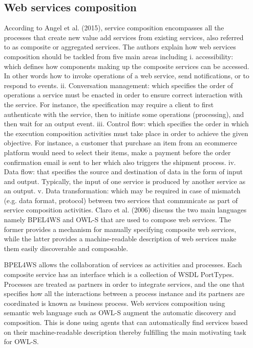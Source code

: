\documentclass{article}
\begin{document}
\begin{multicols}{2}
\subsection{Web services composition}
According to Angel et al. (2015), service composition encompasses all the processes that create new value add services from existing services, also referred to as composite or aggregated services. The authors explain how web services composition should be tackled from five main areas including i. accessibility: which defines how components making up the composite services can be accessed. In other words how to invoke operations of a web service, send notifications, or to respond to events. ii. Conversation management: which specifies the order of operations a service must be enacted in order to ensure correct interaction with the service. For instance, the specification may require a client to first authenticate with the service, then to initiate some operations (processing), and then wait for an output event. iii. Control flow: which specifies the order in which the execution composition activities must take place in order to achieve the given objective. For instance, a customer that purchase an item from an ecommerce platform would need to select their items, make a payment before the order confirmation email is sent to her which also triggers the shipment process. iv. Data flow: that specifies the source and destination of data in the form of input and output. Typically, the input of one service is produced by another service as an output. v. Data transformation: which may be required in case of mismatch (e.g. data format, protocol) between two services that communicate as part of service composition activities.
Claro et al. (2006) discuss the two main languages namely BPEL4WS  and  OWL-S that are used to compose web  services. The former provides  a mechanism for manually specifying composite web services, while the latter provides a  machine-readable  description  of  web  services make them easily discoverable  and  composable. 

BPEL4WS  allows  the  collaboration of  services  as  activities  and  processes. Each composite service has an interface which is a collection of WSDL PortTypes. Processes are treated as partners in order to integrate services, and the one that specifies how  all the interactions between a process   instance  and  its  partners are coordinated is known as business process. Web services composition using  semantic web language such as OWL-S augment the automatic discovery and composition. This is done using agents that can  automatically find  services  based  on  their  machine-readable description thereby fulfilling the  main  motivating  task  for  OWL-S.
 

\end{multicols}
\end{document}
